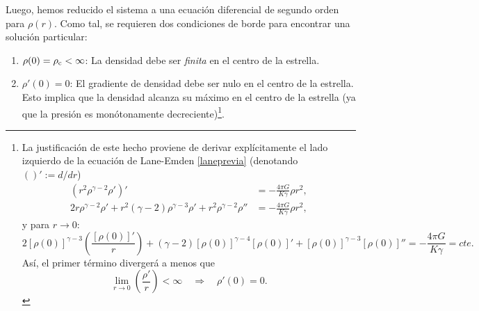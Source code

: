 Luego, hemos reducido el sistema a una ecuación diferencial de segundo orden para $\rho(r)$. Como tal, se requieren dos condiciones de borde para encontrar una solución particular:
\begin{enumerate}
\item $\rho(0)=\rho_{\rm c}<\infty$: La densidad debe ser \textit{finita} en el centro de la estrella.
\item $\rho'(0)=0$: El gradiente de densidad debe ser nulo en el centro de la estrella. Esto implica que la densidad alcanza su máximo en el centro de la estrella (ya que la presión es monótonamente decreciente)\footnote{La justificación de este hecho proviene de derivar explícitamente el lado izquierdo de la ecuación de Lane-Emden \eqref{laneprevia} (denotando $()':=d/dr$)
\begin{align}
\left(r^2\rho^{\gamma-2}\rho'\right)'&=-\frac{4\pi G}{K \gamma}\rho r^2,\\
 2r\rho^{\gamma-2}\rho'+r^2(\gamma-2)\rho^{\gamma-3}\rho'+r^2\rho^{\gamma-2}\rho''&=-\frac{4\pi G}{K \gamma}\rho r^2,
\end{align}
y para $r\to 0$:
\begin{equation}
2\left[\rho(0)\right]^{\gamma-3}\left(\frac{\left[\rho(0)\right]'}{r}\right)+(\gamma-2)\left[\rho(0)\right]^{\gamma-4}\left[\rho(0)\right]'
+\left[\rho(0)\right]^{\gamma-3}\left[\rho(0)\right]''=-\frac{4\pi G}{K \gamma}=cte.
\end{equation}
Así, el primer término divergerá a menos que
\begin{equation}\label{divergencia2}
 \lim_{r\to 0}\left(\frac{\rho'}{r}\right)<\infty\quad\Rightarrow\quad\rho'(0)=0.
\end{equation}}.
\end{enumerate}


